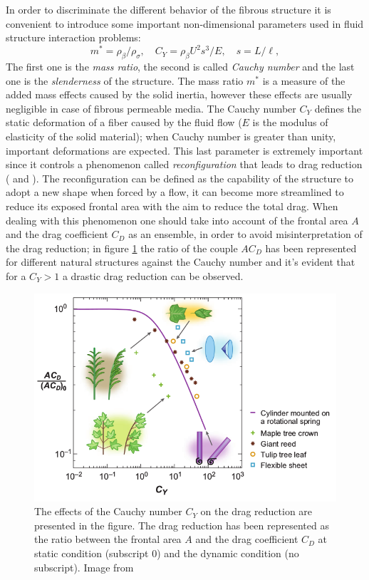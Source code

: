 In order to discriminate the different behavior of the fibrous structure it is convenient to introduce some important non-dimensional parameters used in fluid structure interaction problems:
$$ m^* = \rho_{\beta} / \rho_{\sigma}, \quad C_Y= \rho_{\beta} U^2 s^3 / E, \quad s = L/\ell, $$
The first one is the \textit{mass ratio}, the second is called \textit{Cauchy number} and the last one is the \textit{slenderness} of the structure.
The mass ratio $m^*$ is a measure of the added mass effects caused by the solid inertia, however these effects are usually negligible in case of fibrous permeable media.
The Cauchy number $C_Y$ defines the static deformation of a fiber caused by the fluid flow ($E$ is the modulus of elasticity of the solid material); when Cauchy number is greater than unity, important deformations are expected.
This last parameter is extremely important since it controls a phenomenon called \textit{reconfiguration} that leads to drag reduction (\citet{gosselin2011drag} and \citet{alvarado2017nature}).
The reconfiguration can be defined as the capability of the structure to adopt a new shape when forced by a flow, it can become more streamlined to reduce its exposed frontal area with the aim to reduce the total drag.
When dealing with this phenomenon one should take into account of the frontal area $A$ and the drag coefficient $C_D$ as an ensemble, in order to avoid misinterpretation of the drag reduction; in figure \ref{fig:cycd} the ratio of the couple $AC_D$ has been represented for different natural structures against the Cauchy number and it's evident that for a $C_Y>1$ a drastic drag reduction can be observed.

\begin{figure}[h]
	\centering
	\includegraphics[width=0.7\linewidth]{chapter_1/cy_cd}
	\caption{The effects of the Cauchy number $C_Y$ on the drag reduction are presented in the figure. The drag reduction has been represented as the ratio between the frontal area $A$ and the drag coefficient $C_D$ at static condition (subscript $0$) and the dynamic condition (no subscript). Image from \citet{de2008effects}}
	\label{fig:cycd}
\end{figure}

